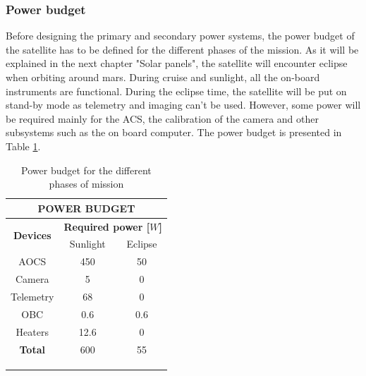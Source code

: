 \documentclass[a4paper, oneside, 11pt]{article}
\begin{document}
\subsubsection{Power budget}

Before designing the primary and secondary power systems, the power budget of the satellite has to be defined for the different phases of the mission. As it will be explained in the next chapter "Solar panels", the satellite will encounter eclipse when orbiting around mars. During cruise and sunlight, all the on-board instruments are functional. During the eclipse time, the satellite will be put on stand-by mode as telemetry and imaging can't be used. However, some power will be required mainly for the ACS, the calibration of the camera and other subsystems such as the on board computer. The power budget is presented in Table \ref{Power_budget}.

\begin{table}[H]
\centering
\caption{Power budget for the different phases of mission}
\label{Power_budget}
\begin{tabular}{ccc}
\hline
\multicolumn{3}{|c|}{\textbf{POWER BUDGET}}                                                                            \\ \hline
\multicolumn{1}{|c|}{\multirow{2}{*}{\textbf{Devices}}} & \multicolumn{2}{c|}{\textbf{Required power [$W$]}}             \\ \cline{2-3} 
\multicolumn{1}{|c|}{}                                  & \multicolumn{1}{c|}{Sunlight} & \multicolumn{1}{c|}{Eclipse} \\ \hline
\multicolumn{1}{|c|}{AOCS}                              & \multicolumn{1}{c|}{450}      & \multicolumn{1}{c|}{50}      \\ 
\multicolumn{1}{|c|}{Camera}                            & \multicolumn{1}{c|}{5}        & \multicolumn{1}{c|}{0}       \\ 
\multicolumn{1}{|c|}{Telemetry}                         & \multicolumn{1}{c|}{68}       & \multicolumn{1}{c|}{0}       \\ 
\multicolumn{1}{|c|}{OBC}                               & \multicolumn{1}{c|}{0.6}      & \multicolumn{1}{c|}{0.6}     \\ 
\multicolumn{1}{|c|}{Heaters}                           & \multicolumn{1}{c|}{12.6}     & \multicolumn{1}{c|}{0}       \\ \hline
\multicolumn{1}{|c|}{\textbf{Total}}                    & \multicolumn{1}{c|}{600}      & \multicolumn{1}{c|}{55}      \\ \hline
\textbf{}                                               &                               & \multicolumn{1}{l}{}         \\
\textbf{}                                               &                               & \multicolumn{1}{l}{}         \\
\multicolumn{1}{l}{}                                    & \multicolumn{1}{l}{}          & \multicolumn{1}{l}{}        
\end{tabular}
\end{table}
\end{document}
